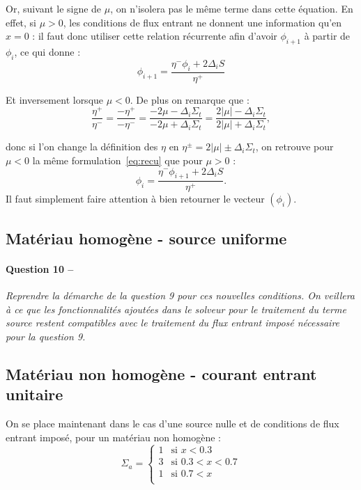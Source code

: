 \documentclass[11pt,a4paper]{article}
\newcommand{\question}[2]{\paragraph{Question #1 --}\hspace{-7pt}\textit{#2} \\}
\begin{document}
Or, suivant le signe de $\mu$, on n'isolera pas le même terme dans cette équation.
En effet, si $\mu>0$, les conditions de flux entrant ne donnent une information qu'en $x=0$ : il faut donc utiliser cette relation récurrente afin d'avoir $\phi_{i+1}$ à partir de $\phi_i$, ce qui donne :
\begin{equation}
 \phi_{i+1} = \frac{\eta^- \phi_i + 2 \Delta_i S}{\eta^+}
 \label{eq:recu}
\end{equation}

Et inversement lorsque $\mu<0$.
De plus on remarque que :
\begin{equation}
 \frac{\eta^+}{\eta^-} = \frac{- \eta^+}{-\eta^-} = \frac{-2 \mu - \Delta_i \Sigma_t}{-2 \mu + \Delta_i \Sigma_t} = \frac{2 |\mu| - \Delta_i \Sigma_t}{2 |\mu| + \Delta_i \Sigma_t} ,
\end{equation}

donc si l'on change la définition des $\eta$ en $\eta^{\pm} = 2|\mu| \pm \Delta_i \Sigma_t$, on retrouve pour $\mu<0$ la même formulation~\ref{eq:recu} que pour $\mu>0$ :
\begin{equation}
 \phi_i = \frac{\eta^- \phi_{i+1} + 2 \Delta_i S}{\eta^+} .
\end{equation}
Il faut simplement faire attention à bien retourner le vecteur $(\phi_i)$.

\subsection{Matériau homogène - source uniforme}

\question{10}{Reprendre la démarche de la question 9 pour ces nouvelles conditions. On veillera à ce que les fonctionnalités
 ajoutées dans le solveur pour le traitement du terme source restent compatibles avec le traitement du flux entrant imposé nécessaire pour la question 9.}

 \subsection{Matériau non homogène - courant entrant unitaire}
 
 On se place maintenant dans le cas d'une source nulle et de conditions de flux entrant imposé, pour un matériau non homogène :
\begin{equation}
  \Sigma_a =
  \begin{cases}
    1 &\mbox{si } x<0.3 \\
    3 &\mbox{si } 0.3<x<0.7 \\
    1 &\mbox{si } 0.7<x \\
  \end{cases}
\end{equation}
\end{document}
